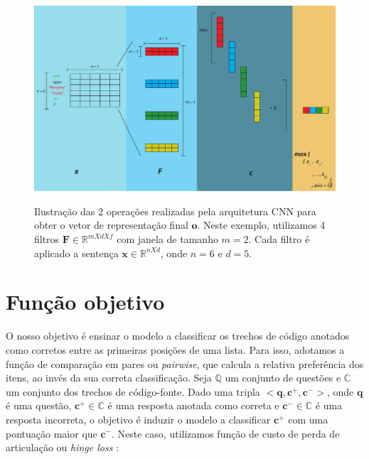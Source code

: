 \begin{figure}[h]
    \centering
    \caption[Ilustração das 2 operações realizadas pela arquitetura CNN para obter o vetor de representação final $\bm{o}$.]{Ilustração das 2 operações realizadas pela arquitetura CNN para obter o vetor de representação final $\bm{o}$. Neste exemplo, utilizamos 4 filtros $\bm{F} \in \mathbb{R}^{m X d X f}$ com janela de tamanho $m = 2$. Cada filtro é aplicado a sentença $\bm{x} \in \mathbb{R}^{n X d}$, onde $n = 6$ e $d = 5$. }
    \includegraphics[width=1\textwidth]{figuras/cap-problema/cnn-steps-word-embedding-article.pdf}
    \label{fig:cnn-architecture-proposal}
\end{figure}




\section{Função objetivo}
\label{sec:funcao-objetivo}

O nosso objetivo é ensinar o modelo a classificar os trechos de código anotados como corretos entre as primeiras posições de uma lista. Para isso, adotamos a função de comparação em pares ou \textit{pairwise}, que calcula a relativa preferência dos itens, ao invés da sua correta classificação. Seja $\mathbb{Q}$ um conjunto de questões e $\mathbb{C}$ um conjunto dos trechos de código-fonte. Dado uma tripla $<\bm{q}, \bm{c^{+}}, \bm{c^{-}}>$, onde $\bm{q}$ 
é uma questão, $\bm{c^{+}} \in \mathbb{C}$ é uma resposta anotada como correta e $\bm{c^{-}} \in \mathbb{C}$ é uma resposta incorreta, o objetivo é induzir o modelo a classificar $\bm{c^{+}}$ com uma pontuação maior que $\bm{c^{-}}$. Neste caso, utilizamos função de custo de perda de articulação ou \textit{hinge loss} \cite{feng-2015}:

